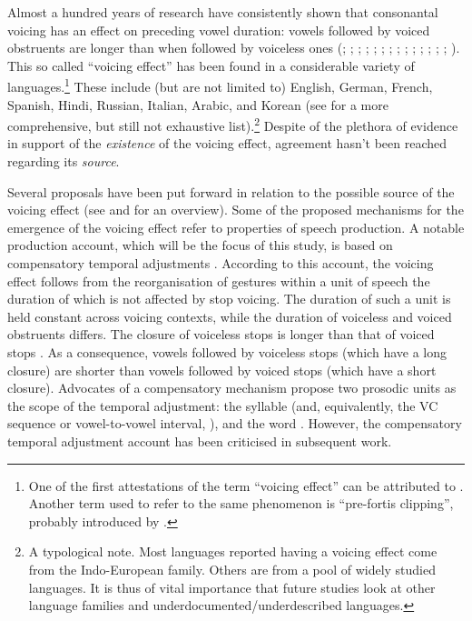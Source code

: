 \documentclass[charis]{glossa}
\begin{document}
Almost a hundred years of research have consistently shown that
consonantal voicing has an effect on preceding vowel duration: vowels
followed by voiced obstruents are longer than when followed by voiceless
ones (\citealt{meyer1904}; \citealt{heffner1937}; \citealt{belasco1953};
\citealt{house1953}; \citealt{peterson1960}; \citealt{halle1967};
\citealt{chen1970}; \citealt{klatt1973}; \citealt{lisker1974};
\citealt{fowler1992}; \citealt{laeufer1992}; \citealt{hussein1994};
\citealt{lampp2004}; \citealt{warren2005}; \citealt{durvasula2012}).
This so called ``voicing effect'' has been found in a considerable
variety of
languages.\footnote{One of the first attestations of the term ``voicing effect'' can be attributed to \citet{mitleb1982}. Another term used to refer to the same phenomenon is ``pre-fortis clipping'', probably introduced by \citet{wells1990}.}
These include (but are not limited to) English, German, French, Spanish,
Hindi, Russian, Italian, Arabic, and Korean (see \citealt{maddieson1976}
for a more comprehensive, but still not exhaustive
list).\footnote{A typological note. Most languages reported having a voicing effect come from the Indo-European family. Others are from a pool of widely studied languages. It is thus of vital importance that future studies look at other language families and underdocumented/underdescribed languages.}
Despite of the plethora of evidence in support of the \emph{existence}
of the voicing effect, agreement hasn't been reached regarding its
\emph{source}.

Several proposals have been put forward in relation to the possible
source of the voicing effect (see \citealt{soskuthy2013} and
\citealt{begus2017} for an overview). Some of the proposed mechanisms
for the emergence of the voicing effect refer to properties of speech
production. A notable production account, which will be the focus of
this study, is based on compensatory temporal adjustments
\citep{lindblom1967, slis1969a, slis1969, lehiste1970a, lehiste1970}.
According to this account, the voicing effect follows from the
reorganisation of gestures within a unit of speech the duration of which
is not affected by stop voicing. The duration of such a unit is held
constant across voicing contexts, while the duration of voiceless and
voiced obstruents differs. The closure of voiceless stops is longer than
that of voiced stops
\citep{lisker1957, van-summers1987, davis1989, de-jong1991}. As a
consequence, vowels followed by voiceless stops (which have a long
closure) are shorter than vowels followed by voiced stops (which have a
short closure). Advocates of a compensatory mechanism propose two
prosodic units as the scope of the temporal adjustment: the syllable
(and, equivalently, the VC sequence or vowel-to-vowel interval,
\citealt{lindblom1967, farnetani1986}), and the word
\citep{slis1969a, slis1969, lehiste1970a, lehiste1970}. However, the
compensatory temporal adjustment account has been criticised in
subsequent work.
\end{document}
